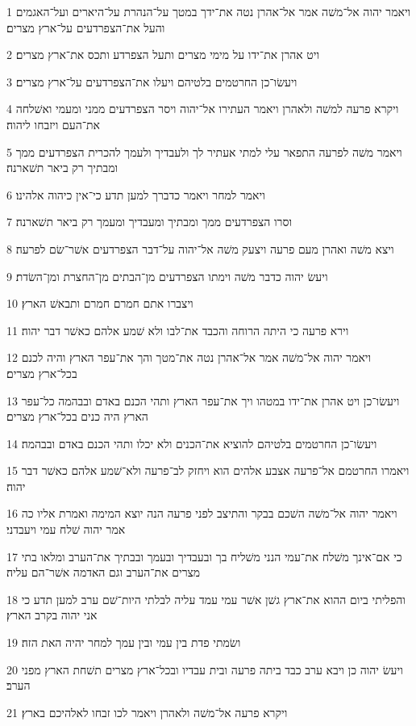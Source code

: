 \par 1 ויאמר יהוה אל־משׁה אמר אל־אהרן נטה את־ידך במטך על־הנהרת על־היארים ועל־האגמים והעל את־הצפרדעים על־ארץ מצרים׃
\par 2 ויט אהרן את־ידו על מימי מצרים ותעל הצפרדע ותכס את־ארץ מצרים׃
\par 3 ויעשׂו־כן החרטמים בלטיהם ויעלו את־הצפרדעים על־ארץ מצרים׃
\par 4 ויקרא פרעה למשׁה ולאהרן ויאמר העתירו אל־יהוה ויסר הצפרדעים ממני ומעמי ואשׁלחה את־העם ויזבחו ליהוה׃
\par 5 ויאמר משׁה לפרעה התפאר עלי למתי אעתיר לך ולעבדיך ולעמך להכרית הצפרדעים ממך ומבתיך רק ביאר תשׁארנה׃
\par 6 ויאמר למחר ויאמר כדברך למען תדע כי־אין כיהוה אלהינו׃
\par 7 וסרו הצפרדעים ממך ומבתיך ומעבדיך ומעמך רק ביאר תשׁארנה׃
\par 8 ויצא משׁה ואהרן מעם פרעה ויצעק משׁה אל־יהוה על־דבר הצפרדעים אשׁר־שׂם לפרעה׃
\par 9 ויעשׂ יהוה כדבר משׁה וימתו הצפרדעים מן־הבתים מן־החצרת ומן־השׂדת׃
\par 10 ויצברו אתם חמרם חמרם ותבאשׁ הארץ׃
\par 11 וירא פרעה כי היתה הרוחה והכבד את־לבו ולא שׁמע אלהם כאשׁר דבר יהוה׃
\par 12 ויאמר יהוה אל־משׁה אמר אל־אהרן נטה את־מטך והך את־עפר הארץ והיה לכנם בכל־ארץ מצרים׃
\par 13 ויעשׂו־כן ויט אהרן את־ידו במטהו ויך את־עפר הארץ ותהי הכנם באדם ובבהמה כל־עפר הארץ היה כנים בכל־ארץ מצרים׃
\par 14 ויעשׂו־כן החרטמים בלטיהם להוציא את־הכנים ולא יכלו ותהי הכנם באדם ובבהמה׃
\par 15 ויאמרו החרטמם אל־פרעה אצבע אלהים הוא ויחזק לב־פרעה ולא־שׁמע אלהם כאשׁר דבר יהוה׃
\par 16 ויאמר יהוה אל־משׁה השׁכם בבקר והתיצב לפני פרעה הנה יוצא המימה ואמרת אליו כה אמר יהוה שׁלח עמי ויעבדני׃
\par 17 כי אם־אינך משׁלח את־עמי הנני משׁליח בך ובעבדיך ובעמך ובבתיך את־הערב ומלאו בתי מצרים את־הערב וגם האדמה אשׁר־הם עליה׃
\par 18 והפליתי ביום ההוא את־ארץ גשׁן אשׁר עמי עמד עליה לבלתי היות־שׁם ערב למען תדע כי אני יהוה בקרב הארץ׃
\par 19 ושׂמתי פדת בין עמי ובין עמך למחר יהיה האת הזה׃
\par 20 ויעשׂ יהוה כן ויבא ערב כבד ביתה פרעה ובית עבדיו ובכל־ארץ מצרים תשׁחת הארץ מפני הערב׃
\par 21 ויקרא פרעה אל־משׁה ולאהרן ויאמר לכו זבחו לאלהיכם בארץ׃
